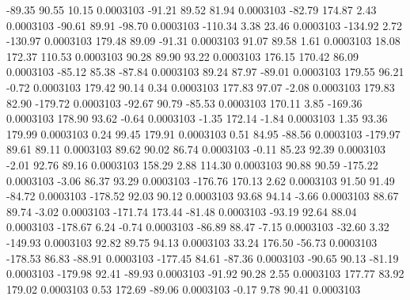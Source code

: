       -89.35       90.55       10.15     0.0003103
      -91.21       89.52       81.94     0.0003103
      -82.79      174.87        2.43     0.0003103
      -90.61       89.91      -98.70     0.0003103
     -110.34        3.38       23.46     0.0003103
     -134.92        2.72     -130.97     0.0003103
      179.48       89.09      -91.31     0.0003103
       91.07       89.58        1.61     0.0003103
       18.08      172.37      110.53     0.0003103
       90.28       89.90       93.22     0.0003103
      176.15      170.42       86.09     0.0003103
      -85.12       85.38      -87.84     0.0003103
       89.24       87.97      -89.01     0.0003103
      179.55       96.21       -0.72     0.0003103
      179.42       90.14        0.34     0.0003103
      177.83       97.07       -2.08     0.0003103
      179.83       82.90     -179.72     0.0003103
      -92.67       90.79      -85.53     0.0003103
      170.11        3.85     -169.36     0.0003103
      178.90       93.62       -0.64     0.0003103
       -1.35      172.14       -1.84     0.0003103
        1.35       93.36      179.99     0.0003103
        0.24       99.45      179.91     0.0003103
        0.51       84.95      -88.56     0.0003103
     -179.97       89.61       89.11     0.0003103
       89.62       90.02       86.74     0.0003103
       -0.11       85.23       92.39     0.0003103
       -2.01       92.76       89.16     0.0003103
      158.29        2.88      114.30     0.0003103
       90.88       90.59     -175.22     0.0003103
       -3.06       86.37       93.29     0.0003103
     -176.76      170.13        2.62     0.0003103
       91.50       91.49      -84.72     0.0003103
     -178.52       92.03       90.12     0.0003103
       93.68       94.14       -3.66     0.0003103
       88.67       89.74       -3.02     0.0003103
     -171.74      173.44      -81.48     0.0003103
      -93.19       92.64       88.04     0.0003103
     -178.67        6.24       -0.74     0.0003103
      -86.89       88.47       -7.15     0.0003103
      -32.60        3.32     -149.93     0.0003103
       92.82       89.75       94.13     0.0003103
       33.24      176.50      -56.73     0.0003103
     -178.53       86.83      -88.91     0.0003103
     -177.45       84.61      -87.36     0.0003103
      -90.65       90.13      -81.19     0.0003103
     -179.98       92.41      -89.93     0.0003103
      -91.92       90.28        2.55     0.0003103
      177.77       83.92      179.02     0.0003103
        0.53      172.69      -89.06     0.0003103
       -0.17        9.78       90.41     0.0003103
